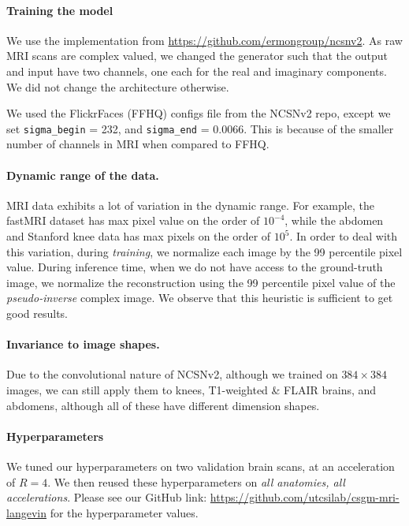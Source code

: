 \documentclass{article}
\newcounter{example}[section]
\begin{document}
\paragraph{Training the model} We use the implementation from
\url{https://github.com/ermongroup/ncsnv2}. As raw MRI scans are complex
valued, we changed the generator such that the output and input have
two channels, one each for the real and imaginary components. We did
not change the architecture otherwise.

We used the FlickrFaces (FFHQ) configs file from the NCSNv2 repo,
except we set \texttt{sigma\_begin} = 232, and \texttt{sigma\_end} =
0.0066. This is because of the smaller number of channels in MRI when
compared to FFHQ.

\paragraph{Dynamic range of the data.} MRI data exhibits a lot of
variation in the dynamic range. For example, the fastMRI dataset has
max pixel value on the order of $10^{-4}$, while the abdomen and
Stanford knee data has max pixels on the order of $10^5$. In order to
deal with this variation, during \emph{training}, we normalize each
image by the 99 percentile pixel value. During inference time, when we
do not have access to the ground-truth image, we normalize the
reconstruction using the 99 percentile pixel value of the
\emph{pseudo-inverse} complex image. We observe that this heuristic is sufficient to
get good results.

\paragraph{Invariance to image shapes.} Due to the convolutional
nature of NCSNv2, although we trained on $384\times 384$ images, we
can still apply them to knees, T1-weighted \& FLAIR brains, and
abdomens, although all of these have different dimension shapes. 

\paragraph{Hyperparameters} We tuned our hyperparameters on two validation brain scans, at an acceleration of $R=4$. We then reused these hyperparameters on \emph{all anatomies, all accelerations}. Please see our GitHub link: 
\url{https://github.com/utcsilab/csgm-mri-langevin} for the hyperparameter values.
\end{document}
